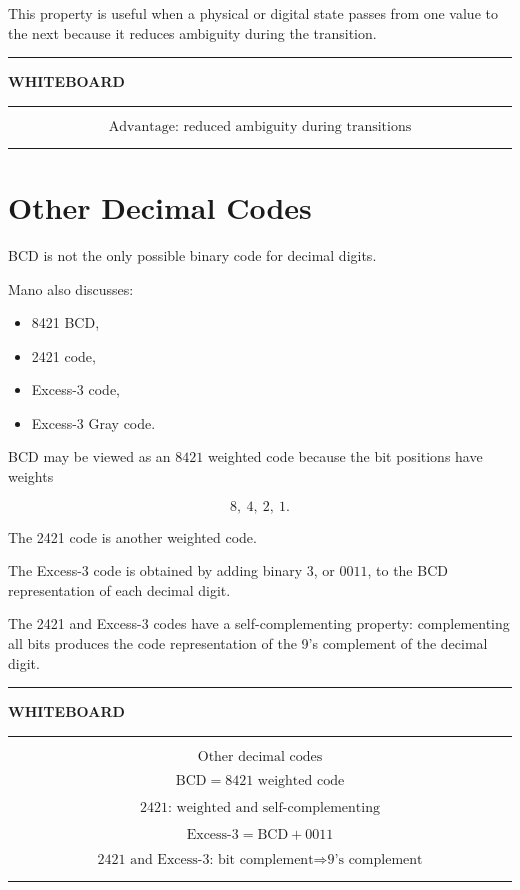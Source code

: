 \documentclass[11pt]{article}
\newenvironment{whiteboard}
{
    \par\medskip
    \begin{center}
    \begin{minipage}{0.94\textwidth}
    \hrule
    \vspace{0.4em}
    \textbf{\large WHITEBOARD}
    \vspace{0.3em}
    \hrule
    \vspace{0.7em}
}
{
    \vspace{0.5em}
    \hrule
    \end{minipage}
    \end{center}
    \medskip
}
\begin{document}
This property is useful when a physical or digital state passes from one value
to the next because it reduces ambiguity during the transition.

\begin{whiteboard}
\[
\boxed{\text{Advantage: reduced ambiguity during transitions}}
\]
\end{whiteboard}

\section{Other Decimal Codes}

BCD is not the only possible binary code for decimal digits.

Mano also discusses:

\begin{itemize}
    \item 8421 BCD,
    \item 2421 code,
    \item Excess-3 code,
    \item Excess-3 Gray code.
\end{itemize}

BCD may be viewed as an \(8421\) weighted code because the bit positions have
weights

\[
8,\ 4,\ 2,\ 1.
\]

The 2421 code is another weighted code.

The Excess-3 code is obtained by adding binary \(3\), or \(0011\), to the BCD
representation of each decimal digit.

The 2421 and Excess-3 codes have a self-complementing property: complementing
all bits produces the code representation of the 9's complement of the
decimal digit.

\begin{whiteboard}
\[
\boxed{\text{Other decimal codes}}
\]

\[
\text{BCD}=8421\text{ weighted code}
\]

\[
\text{2421: weighted and self-complementing}
\]

\[
\text{Excess-3}=\text{BCD}+0011
\]

\[
\boxed{
\text{2421 and Excess-3: bit complement}
\Rightarrow
\text{9's complement}}
\]
\end{whiteboard}

\end{document}
